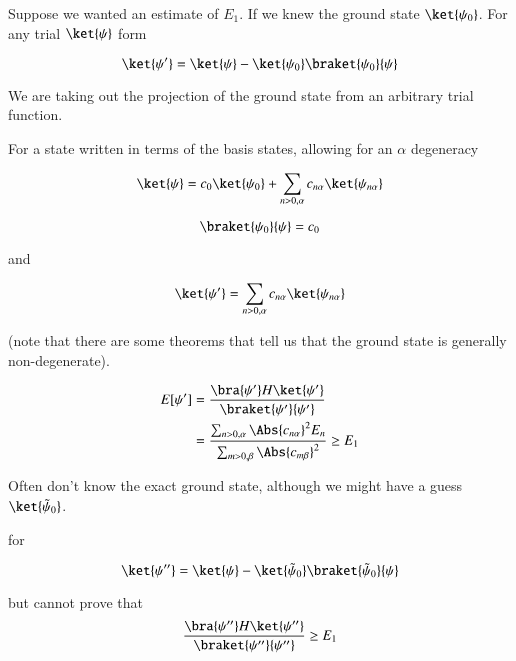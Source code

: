 Suppose we wanted an estimate of $E_1$.  If we knew the ground state $\ket{\psi_0}$.  For any trial $\ket{\psi}$ form

\begin{equation}\label{eqn:qmTwoL3:170}
\ket{\psi'} = 
\ket{\psi} - 
\ket{\psi_0}  \braket{\psi_0}{\psi}
\end{equation}

We are taking out the projection of the ground state from an arbitrary trial function.

For a state written in terms of the basis states, allowing for an $\alpha$ degeneracy

\begin{equation}\label{eqn:qmTwoL3:190}
\ket{\psi} = 
c_0 \ket{\psi_0}  
+
\sum_{n> 0, \alpha} c_{n \alpha} \ket{\psi_{n \alpha}}
\end{equation}

\begin{equation}\label{eqn:qmTwoL3:210}
\braket{\psi_0}{\psi} = 
c_0 
\end{equation}

and

\begin{equation}\label{eqn:qmTwoL3:230}
\ket{\psi'} = 
\sum_{n> 0, \alpha} c_{n \alpha} \ket{\psi_{n \alpha}}
\end{equation}

(note that there are some theorems that tell us that the ground state is generally non-degenerate).

\begin{align*}
E[\psi'] 
&= 
\frac{
\bra{\psi'} H \ket{\psi'}
}
{
\braket{\psi'}{\psi'}
}  \\
&=
\frac{
\sum_{n> 0, \alpha} \Abs{c_{n \alpha}}^2 E_n
}
{
\sum_{m> 0, \beta} \Abs{c_{m \beta}}^2 
}
\ge E_1
\end{align*}

Often don't know the exact ground state, although we might have a guess $\ket{\tilde{\psi}_0}$.

for

\begin{equation}\label{eqn:qmTwoL3:250}
\ket{\psi''} = \ket{\psi} - 
\ket{\tilde{\psi}_0}
\braket{\tilde{\psi}_0}{\psi}
\end{equation}

but cannot prove that
\begin{equation}\label{eqn:qmTwoL3:270}
\frac{
\bra{\psi''} H \ket{\psi''}
}
{
\braket{\psi''}{\psi''}
} 
\ge E_1
\end{equation}

